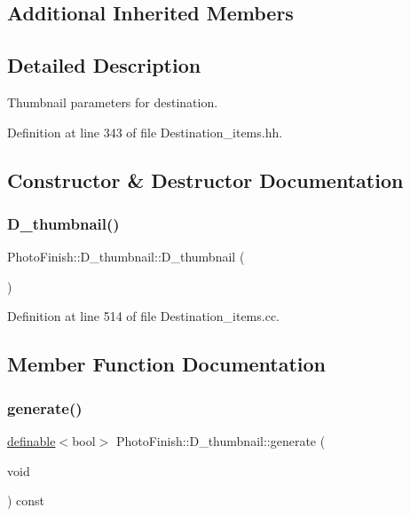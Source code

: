\subsection*{Additional Inherited Members}


\subsection{Detailed Description}
Thumbnail parameters for destination. 

Definition at line 343 of file Destination\+\_\+items.\+hh.



\subsection{Constructor \& Destructor Documentation}
\mbox{\label{class_photo_finish_1_1_d__thumbnail_a3656b828df1e7e6b31f1b6714f1c6432}} 
\subsubsection{\texorpdfstring{D\+\_\+thumbnail()}{D\_thumbnail()}}
{\footnotesize\ttfamily Photo\+Finish\+::\+D\+\_\+thumbnail\+::\+D\+\_\+thumbnail (\begin{DoxyParamCaption}{ }\end{DoxyParamCaption})}



Definition at line 514 of file Destination\+\_\+items.\+cc.



\subsection{Member Function Documentation}
\mbox{\label{class_photo_finish_1_1_d__thumbnail_a95fd0394e3018382f9e3f3122e7cff86}} 
\subsubsection{\texorpdfstring{generate()}{generate()}}
{\footnotesize\ttfamily \hyperlink{class_photo_finish_1_1definable}{definable}$<$bool$>$ Photo\+Finish\+::\+D\+\_\+thumbnail\+::generate (\begin{DoxyParamCaption}\item[{void}]{ }\end{DoxyParamCaption}) const\hspace{0.3cm}{\ttfamily [inline]}}



